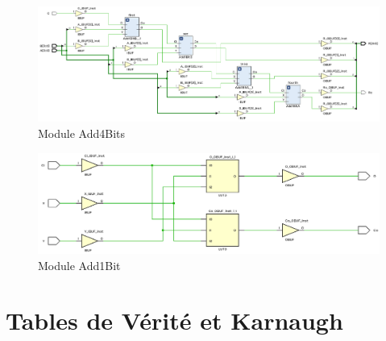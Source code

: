\begin{figure}[H]
\centering
  \includegraphics[width=.7\textwidth]{assets/img/schematic-add4bits.png}
\caption{Module Add4Bits}
\end{figure}

\begin{figure}[H]
\centering
  \includegraphics[width=.7\textwidth]{assets/img/schematic-add1bit.png}
\caption{Module Add1Bit}
\end{figure}

\section{Tables de Vérité et Karnaugh}

\\
